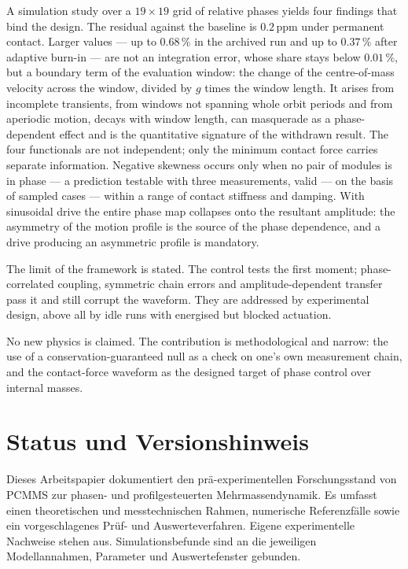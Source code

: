 \documentclass[12pt,a4paper]{report}
\begin{document}
A simulation study over a $19\times19$ grid of relative phases yields
four findings that bind the design. The residual against the baseline
is $0{.}2\,\mathrm{ppm}$ under permanent contact. Larger values --- up to
$0{.}68\,\%$ in the archived run and up to $0{.}37\,\%$ after adaptive
burn-in --- are not an integration error, whose share stays below
$0{.}01\,\%$, but a boundary term of the evaluation window: the change of
the centre-of-mass velocity across the window, divided by $g$ times the
window length. It arises from incomplete transients, from windows not
spanning whole orbit periods and from aperiodic motion, decays with
window length, can masquerade as a phase-dependent effect and is the
quantitative signature of the withdrawn result. The four functionals are not
independent; only the minimum contact force carries separate
information. Negative skewness occurs only when no pair of modules is in
phase --- a prediction testable with three measurements, valid --- on the basis of
sampled cases --- within a range of contact stiffness and damping. With sinusoidal drive the
entire phase map collapses onto the resultant amplitude: the asymmetry
of the motion profile is the source of the phase dependence, and a drive
producing an asymmetric profile is mandatory.

The limit of the framework is stated. The control tests the first
moment; phase-correlated coupling, symmetric chain errors and
amplitude-dependent transfer pass it and still corrupt the waveform.
They are addressed by experimental design, above all by idle runs with
energised but blocked actuation.

No new physics is claimed. The contribution is methodological and
narrow: the use of a conservation-guaranteed null as a check on one's
own measurement chain, and the contact-force waveform as the designed
target of phase control over internal masses.

\clearpage


\chapter*{Status und Versionshinweis}

Dieses Arbeitspapier dokumentiert den prä-experimentellen Forschungsstand
von PCMMS zur phasen- und profilgesteuerten Mehrmassendynamik. Es umfasst
einen theoretischen und messtechnischen Rahmen, numerische Referenzfälle
sowie ein vorgeschlagenes Prüf- und Auswerteverfahren. Eigene
experimentelle Nachweise stehen aus. Simulationsbefunde sind an die
jeweiligen Modellannahmen, Parameter und Auswertefenster gebunden.
\end{document}

